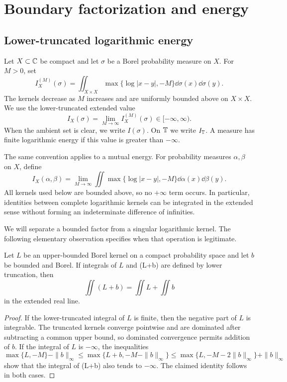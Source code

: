 \section{Boundary factorization and energy}\label{sec:factorization-energy}

\subsection{Lower-truncated logarithmic energy}

Let \(X\subset\mathbb{C}\) be compact and let \(\sigma\) be a Borel
probability measure on \(X\).  For \(M>0\), set
\[
 I_X^{(M)}(\sigma)
 =\iint_{X\times X}
 \max\{\log|x-y|,-M\}\dd\sigma(x)\dd\sigma(y).
\]
The kernels decrease as \(M\) increases and are uniformly bounded
above on \(X\times X\).  We use the lower-truncated extended value
\begin{equation}\label{eq:lower-truncated-energy}
 I_X(\sigma)=\lim_{M\to\infty}I_X^{(M)}(\sigma)\in[-\infty,\infty).
\end{equation}
When the ambient set is clear, we write \(I(\sigma)\).  On \(\mathbb{T}\) we
write \(I_{\mathbb{T}}\).  A measure has finite logarithmic energy if this
value is greater than \(-\infty\).

The same convention applies to a mutual energy.  For probability
measures \(\alpha,\beta\) on \(X\), define
\[
 I_X(\alpha,\beta)
 =\lim_{M\to\infty}
 \iint\max\{\log|x-y|,-M\}\dd\alpha(x)\dd\beta(y).
\]
All kernels used below are bounded above, so no \(+\infty\) term occurs.
In particular, identities between complete logarithmic kernels can be
integrated in the extended sense without forming an indeterminate
difference of infinities.

We will separate a bounded factor from a singular logarithmic kernel.
The following elementary observation specifies when that operation is
legitimate.

\begin{lemma}\label{lem:bounded-separation}
Let \(L\) be an upper-bounded Borel kernel on a compact probability
space and let \(b\) be bounded and Borel.  If integrals of \(L\) and
(L+b) are defined by lower truncation, then
\[
 \iint(L+b)=\iint L+\iint b
\]
in the extended real line.
\end{lemma}

\begin{proof}
If the lower-truncated integral of \(L\) is finite, then the negative
part of \(L\) is integrable.  The truncated kernels converge pointwise
and are dominated after subtracting a common upper bound, so dominated
convergence permits addition of \(b\).  If the integral of \(L\) is
\(-\infty\), the inequalities
\[
 \max\{L,-M\}-\|b\|_\infty
 \leq \max\{L+b,-M-\|b\|_\infty\}
 \leq \max\{L,-M-2\|b\|_\infty\}+\|b\|_\infty
\]
show that the integral of (L+b) also tends to \(-\infty\).  The
claimed identity follows in both cases.
\end{proof}

